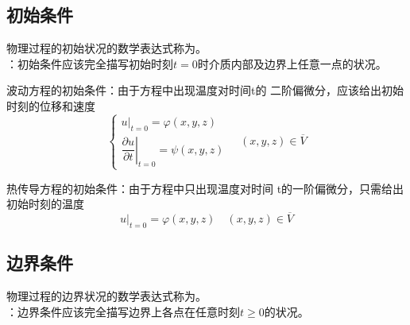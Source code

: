 \subsection{初始条件}
\tdefination[初始条件]
物理过程的初始状况的数学表达式称为。\\
：初始条件应该完全描写初始时刻$t=0$时介质内部及边界上任意一点的状况。
\begin{myitemize}
	\item 波动方程的初始条件：由于方程中出现温度对时间t的
二阶偏微分，应该给出初始时刻的位移和速度
\begin{equation}
	\begin{cases}
		u|_{t=0} = \varphi (x,y,z)\\[0.5em]
		\left. \dfrac{\partial u}{\partial t}\right|_{t=0} = \psi (x,y,z)
	\end{cases}
\quad (x,y,z) \in \overline{V}
\end{equation}

	\item 热传导方程的初始条件：由于方程中只出现温度对时间
t的一阶偏微分，只需给出初始时刻的温度\vspace*{-1em}
\begin{equation}
	u|_{t=0} = \varphi (x,y,z) \quad (x,y,z) \in \overline{V}
\end{equation}
\end{myitemize}
\vspace*{-1em}

\subsection{边界条件}
物理过程的边界状况的数学表达式称为。\\
：边界条件应该完全描写边界上各点在任意时刻$t \ge 0$的状况。

